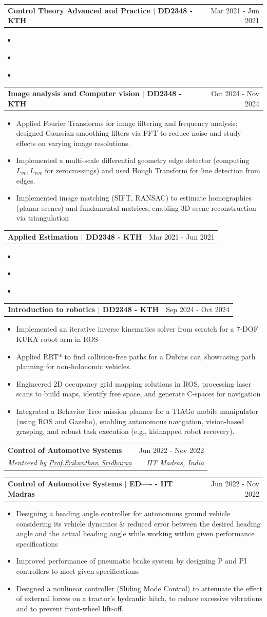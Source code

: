 \documentclass[letterpaper, 11pt]{article}
\makeatletter
\newcommand{\resumeItem}[1]{ \item\small{ {#1 \vspace{-2pt}} } }
\newcommand{\resumeSubheading}[4]{
\vspace{-1pt}
\item
\begin{tabular*}{1.0\textwidth}[t]{l@{\extracolsep{\fill}}r}
	\textbf{#1}       & {\small #2} \\
	{\small#3} & \textit{\small #4} \\
\end{tabular*}
\vspace{-10pt}
}
\newcommand{\resumeProjectHeading}[2]{
\vspace{-1pt}
\item
\begin{tabular*}{1.0\textwidth}[t]{l@{\extracolsep{\fill}}r}
	\textbf{#1}  & {\small #2} \\
\end{tabular*}
\vspace{-20pt}
}
\newcommand{\resumeItemListStart}{\begin{itemize}[leftmargin=0.25in]}
\newcommand{\resumeItemListEnd}{\end{itemize}
\vspace{-5pt}}
\makeatother
\begin{document}
    \resumeProjectHeading{Control Theory Advanced and Practice $|$ \textnormal{\small DD2348 - KTH}}{Mar 2021 - Jun 2021}
    \resumeItemListStart 
        \resumeItem{}
        \resumeItem{}
        \resumeItem{}  
    \resumeItemListEnd

    \resumeProjectHeading{Image analysis and Computer vision $|$ \textnormal{\small DD2348 - KTH}}{Oct 2024 - Nov 2024}
    \resumeItemListStart 
        \resumeItem{Applied Fourier Transforms for image filtering and frequency analysis; designed Gaussian smoothing filters via FFT to reduce noise and study effects on varying image resolutions.}
        \resumeItem{Implemented a multi-scale differential geometry edge detector (computing $L_{vv}, L_{vvv}$ for zero\-crossings)
        and used Hough Transform for line detection from edges.}
        \resumeItem{Implemented image matching (SIFT, RANSAC) to estimate homographies (planar scenes) and fundamental matrices, enabling 3D scene reconstruction via triangulation}  
    \resumeItemListEnd

    \resumeProjectHeading{Applied Estimation $|$ \textnormal{\small DD2348 - KTH}}{Mar 2021 - Jun 2021}
    \resumeItemListStart 
        \resumeItem{}
        \resumeItem{}
        \resumeItem{}  
    \resumeItemListEnd

    \resumeProjectHeading{Introduction to robotics $|$ \textnormal{\small DD2348 - KTH}}{Sep 2024 - Oct 2024}
    \resumeItemListStart 
        \resumeItem{Implemented an iterative inverse kinematics solver from scratch for a 7-DOF KUKA robot arm in ROS}
        \resumeItem{Applied RRT* to find collision-free paths for a Dubins car, showcasing path planning for non-holonomic vehicles.}
        \resumeItem{Engineered 2D occupancy grid mapping solutions in ROS, processing laser scans to build maps, identify free space, and generate C-spaces for navigation}  
        \resumeItem{Integrated a Behavior Tree mission planner for a TIAGo mobile manipulator (using ROS and Gazebo), enabling autonomous navigation, vision-based grasping, and robust task execution (e.g., kidnapped robot recovery).}
    \resumeItemListEnd
    
    \resumeSubheading{Control of Automotive Systems}{Jun 2022 - Nov 2022}{\emph{Mentored by \href{https://home.iitm.ac.in/srikanthan/}{ Prof.Srikanthan Sridharan}}}{IIT Madras, India}
    \resumeProjectHeading{Control of Automotive Systems $|$ \textnormal{\small ED---- - IIT Madras}}{Jun 2022 - Nov 2022}
    \resumeItemListStart
        \resumeItem{Designing a heading angle controller for autonomous ground vehicle considering its vehicle dynamics \& reduced error between the desired heading angle and the actual heading angle while working within given performance specifications}
        \resumeItem{Improved performance of pneumatic brake system by designing P and PI controllers to meet given specifications.}
        \resumeItem{Designed a nonlinear controller (Sliding Mode Control) to attenuate the effect of external forces on a tractor’s hydraulic hitch, to reduce excessive vibrations and to prevent front-wheel lift-off.}
    \resumeItemListEnd
    
\end{document}
